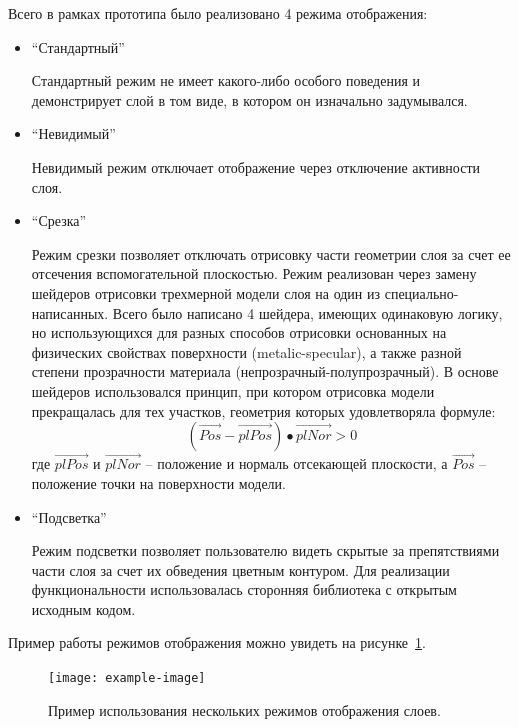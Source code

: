Всего в рамках прототипа было реализовано 4 режима отображения:

\begin{itemize}
    \item {
        ``Стандартный''

        Стандартный режим не имеет какого-либо особого поведения и
        демонстрирует слой в том виде, в котором он изначально задумывался.
    }
    \item {
        ``Невидимый''

        Невидимый режим отключает отображение через отключение активности слоя.
    }
    \item {
        ``Срезка''

        Режим срезки позволяет отключать отрисовку части геометрии слоя
        за счет ее отсечения вспомогательной плоскостью.
        Режим реализован через замену шейдеров отрисовки трехмерной
        модели слоя на один из специально-написанных.
        Всего было написано 4 шейдера, имеющих одинаковую логику,
        но использующихся для разных способов отрисовки основанных на физических
        свойствах поверхности (metalic-specular\cite{DocUnity}),
        а также разной степени прозрачности материала (непрозрачный-полупрозрачный).
        В основе шейдеров использовался принцип,
        при котором отрисовка модели прекращалась для тех участков,
        геометрия которых удовлетворяла формуле:
        \[
            ( \overrightarrow{Pos} - \overrightarrow{plPos} ) \bullet
            \overrightarrow{plNor} > 0
        \]
        где $\overrightarrow{plPos}$ и $\overrightarrow{plNor}$ --
        положение и нормаль отсекающей плоскости,
        а $\overrightarrow{Pos}$ -- положение точки на поверхности модели.%
        \cite{UnityCrossSection}
    }
    \item {
        ``Подсветка''

        Режим подсветки позволяет пользователю видеть скрытые за препятствиями
        части слоя за счет их обведения цветным контуром.
        Для реализации функциональности использовалась сторонняя библиотека
        с открытым исходным кодом.\cite{UnityFxOutline}
    }
\end{itemize}

Пример работы режимов отображения можно увидеть
на рисунке~\ref{figure:LayerModeExample}.

\begin{figure}[!htp]
    \centering
    \texttt{[image: example-image]}
    \caption{Пример использования нескольких режимов отображения слоев.}
    \label{figure:LayerModeExample}
\end{figure}

